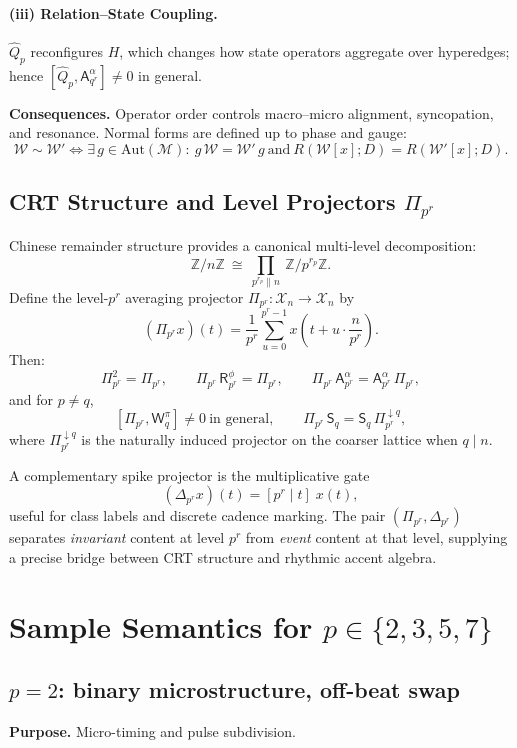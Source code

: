\documentclass[12pt]{article}
\numberwithin{equation}{section}
\theoremstyle{plain}
\theoremstyle{definition}
\theoremstyle{remark}
\begin{document}
\paragraph{(iii) Relation–State Coupling.}
\(\hat{Q}_p\) reconfigures \(H\), which changes how state operators aggregate over hyperedges; hence \([\hat{Q}_p,\mathsf{A}_{q^r}^{\alpha}]\neq 0\) in general.

\medskip
\noindent\textbf{Consequences.} Operator order controls macro–micro alignment, syncopation, and resonance. Normal forms are defined up to phase and gauge:
\[
\mathcal{W}\sim \mathcal{W}' \iff \exists\,g\in\mathrm{Aut}(\mathcal{M}):\ g\,\mathcal{W}=\mathcal{W}'\,g \ \text{and}\ R(\mathcal{W}[x];D)=R(\mathcal{W}'[x];D).
\]

\subsection*{CRT Structure and Level Projectors \(\Pi_{p^r}\)}
Chinese remainder structure provides a canonical multi-level decomposition:
\[
\mathbb{Z}/n\mathbb{Z}\ \cong\ \prod_{p^{r_p}\parallel n}\ \mathbb{Z}/p^{r_p}\mathbb{Z}.
\]
Define the level-\(p^r\) averaging projector \(\Pi_{p^r}:\mathcal{X}_n\to\mathcal{X}_n\) by
\[
(\Pi_{p^r} x)(t)=\frac{1}{p^r}\sum_{u=0}^{p^r-1} x\!\left(t+u\cdot\frac{n}{p^r}\right).
\]
Then:
\[
\Pi_{p^r}^2=\Pi_{p^r},\qquad \Pi_{p^r}\,\mathsf{R}_{p^r}^{\phi}=\Pi_{p^r},\qquad
\Pi_{p^r}\,\mathsf{A}_{p^r}^{\alpha}=\mathsf{A}_{p^r}^{\alpha}\,\Pi_{p^r},
\]
and for \(p\neq q\),
\[
[\Pi_{p^r},\mathsf{W}_q^{\pi}]\neq 0\ \text{in general},\qquad
\Pi_{p^r}\,\mathsf{S}_q=\mathsf{S}_q\,\Pi_{p^r}^{\downarrow q},
\]
where \(\Pi_{p^r}^{\downarrow q}\) is the naturally induced projector on the coarser lattice when \(q\mid n\).  

A complementary spike projector is the multiplicative gate
\[
(\Delta_{p^r}x)(t)=[p^r\mid t]\;x(t),
\]
useful for class labels and discrete cadence marking. The pair \((\Pi_{p^r},\Delta_{p^r})\) separates \emph{invariant} content at level \(p^r\) from \emph{event} content at that level, supplying a precise bridge between CRT structure and rhythmic accent algebra.

\section*{Sample Semantics for $p\in\{2,3,5,7\}$}

\subsection*{$p=2$: binary microstructure, off-beat swap}
\textbf{Purpose.} Micro-timing and pulse subdivision.
\end{document}
